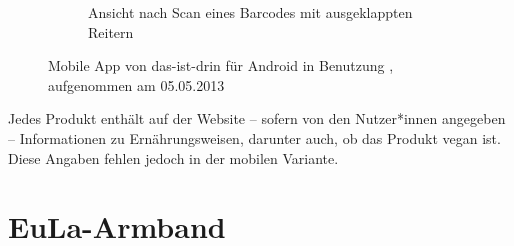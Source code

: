 \begin{figure}[ht]
\begin{subfigure}[b]{0.45\textwidth}
		\caption{Ansicht nach Scan eines Barcodes mit ausgeklappten
		Reitern}
		\label{img:did-2}
	\end{subfigure}
	\caption[Mobile App von das-ist-drin für Android in Benutzung ]{Mobile App von
			das-ist-drin für Android in Benutzung ,
	aufgenommen am 05.05.2013}
	\label{img:did}
\end{figure}

Jedes Produkt enthält auf der Website -- sofern von den Nutzer*innen
angegeben -- Informationen zu Ernährungsweisen, darunter auch, ob das
Produkt vegan ist. Diese
Angaben fehlen jedoch in der mobilen Variante.

\section{EuLa-Armband}
\label{sec:eulaa}

